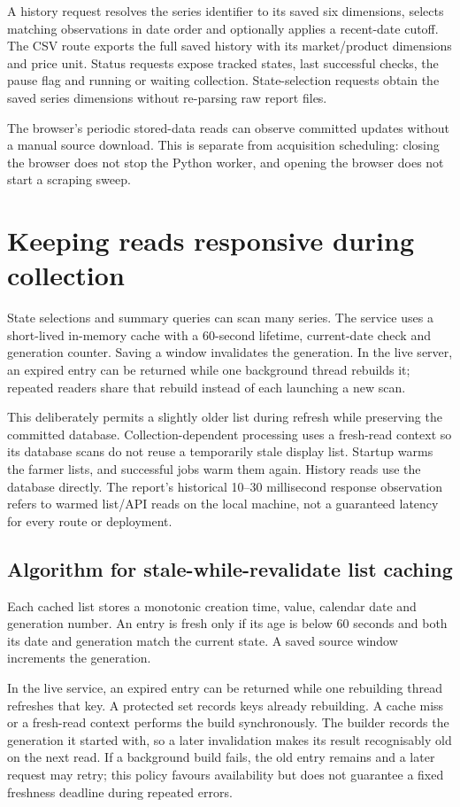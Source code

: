 \documentclass[12pt,a4paper,oneside]{report}
\numberwithin{equation}{chapter}
\numberwithin{figure}{chapter}
\numberwithin{table}{chapter}
\theoremstyle{definition}
\begin{document}
A history request resolves the series identifier to its saved six dimensions, selects matching observations in date order and optionally applies a recent-date cutoff. The CSV route exports the full saved history with its market/product dimensions and price unit. Status requests expose tracked states, last successful checks, the pause flag and running or waiting collection. State-selection requests obtain the saved series dimensions without re-parsing raw report files.

The browser's periodic stored-data reads can observe committed updates without a manual source download. This is separate from acquisition scheduling: closing the browser does not stop the Python worker, and opening the browser does not start a scraping sweep.

\section{Keeping reads responsive during collection}
State selections and summary queries can scan many series. The service uses a short-lived in-memory cache with a 60-second lifetime, current-date check and generation counter. Saving a window invalidates the generation. In the live server, an expired entry can be returned while one background thread rebuilds it; repeated readers share that rebuild instead of each launching a new scan.

This deliberately permits a slightly older list during refresh while preserving the committed database. Collection-dependent processing uses a fresh-read context so its database scans do not reuse a temporarily stale display list. Startup warms the farmer lists, and successful jobs warm them again. History reads use the database directly. The report's historical 10--30 millisecond response observation refers to warmed list/API reads on the local machine, not a guaranteed latency for every route or deployment.

\subsection{Algorithm for stale-while-revalidate list caching}
Each cached list stores a monotonic creation time, value, calendar date and generation number. An entry is fresh only if its age is below 60 seconds and both its date and generation match the current state. A saved source window increments the generation.

In the live service, an expired entry can be returned while one rebuilding thread refreshes that key. A protected set records keys already rebuilding. A cache miss or a fresh-read context performs the build synchronously. The builder records the generation it started with, so a later invalidation makes its result recognisably old on the next read. If a background build fails, the old entry remains and a later request may retry; this policy favours availability but does not guarantee a fixed freshness deadline during repeated errors.
\end{document}
